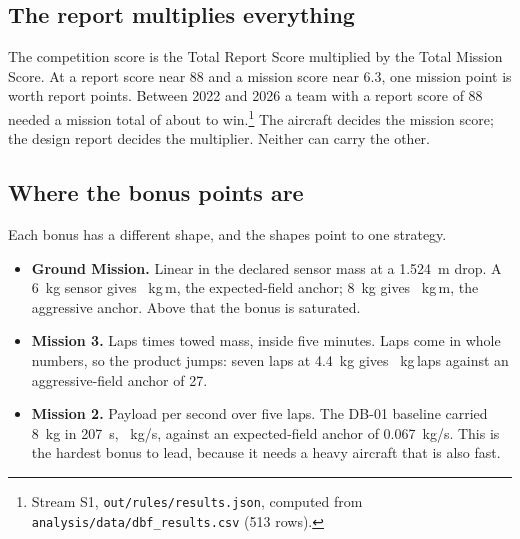 
\subsection{The report multiplies everything}
The competition score is the Total Report Score multiplied by the Total Mission Score. At a report score near 88 and a mission score near 6.3, one mission point is worth  report points. Between 2022 and 2026 a team with a report score of 88 needed a mission total of about  to win.\footnote{Stream S1, \texttt{out/rules/results.json}, computed from \texttt{analysis/data/dbf\_results.csv} (513 rows).} The aircraft decides the mission score; the design report decides the multiplier. Neither can carry the other.

\subsection{Where the bonus points are}
Each bonus has a different shape, and the shapes point to one strategy.

\begin{itemize}
\item \textbf{Ground Mission.} Linear in the declared sensor mass at a 1.524~m drop. A 6~kg sensor gives ~kg\,m, the expected-field anchor; 8~kg gives ~kg\,m, the aggressive anchor. Above that the bonus is saturated.
\item \textbf{Mission 3.} Laps times towed mass, inside five minutes. Laps come in whole numbers, so the product jumps: seven laps at 4.4~kg gives ~kg\,laps against an aggressive-field anchor of 27.
\item \textbf{Mission 2.} Payload per second over five laps. The DB-01 baseline carried 8~kg in 207~s, ~kg/s, against an expected-field anchor of 0.067~kg/s. This is the hardest bonus to lead, because it needs a heavy aircraft that is also fast.
\end{itemize}


